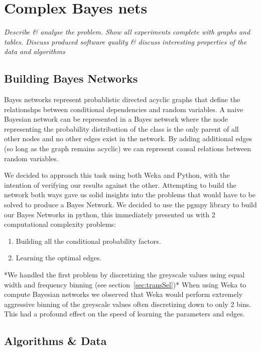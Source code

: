 \documentclass[11pt]{article}
\begin{document}
\pagebreak

\section{Complex Bayes nets}
\par
\emph{Describe \& analyse the problem. Show all experiments complete with graphs and tables. Discuss produced software quality \& discuss interesting properties of the data and algorithms}

\subsection{Building Bayes Networks}
Bayes networks represent probablistic directed acyclic graphs that define the relationshps between conditional dependencies and random variables.
A naive Bayesian network can be represented in a Bayes network where the node representing the probability distribution of the class is the only parent of all other nodes and no other edges exist in the network. 
By adding additional edges (so long as the graph remains acyclic) we can represent causal relations between random variables.
\par
We decided to approach this task using both Weka and Python, with the intention of verifying our results against the other.
Attempting to build the network both ways gave us solid insights into the problems that would have to be solved to produce a Bayes Network.
We decided to use the pgmpy library to build our Bayes Networks in python, this immediately presented us with 2 computational complexity problems:
\begin{enumerate}
    \item Building all the conditional probability factors.
    \item Learning the optimal edges.
\end{enumerate}

*We handled the first problem by discretizing the greyscale values using equal width and frequency binning (see section~\ref{sec:transSel})*
When using Weka to compute Bayesian networks we observed that Weka would perform extremely aggressive binning of the greyscale values often discretizing down to only 2 bins. This had a profound effect on the speed of learning the parameters and edges.

\subsection{Algorithms \& Data}
\end{document}
